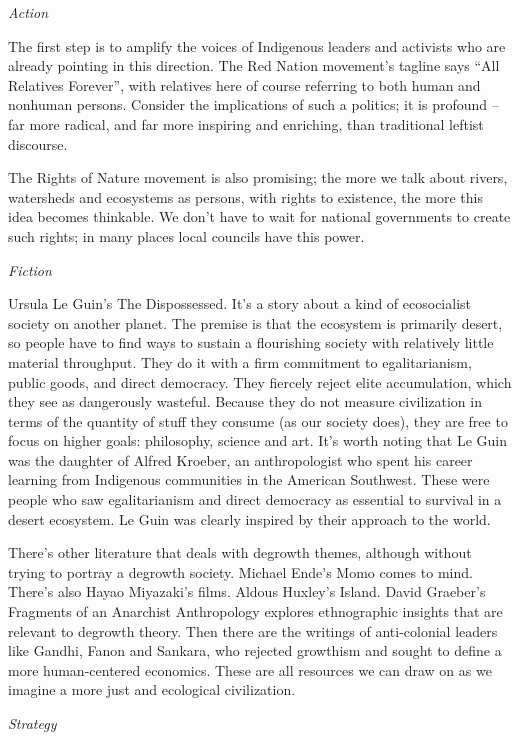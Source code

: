\documentclass[
]{book}
\begin{document}
\emph{Action}

The first step is to amplify the voices of Indigenous leaders and activists who are already pointing in this direction. The Red Nation movement's tagline says ``All Relatives Forever'', with relatives here of course referring to both human and nonhuman persons. Consider the implications of such a politics; it is profound -- far more radical, and far more inspiring and enriching, than traditional leftist discourse.

The Rights of Nature movement is also promising; the more we talk about rivers, watersheds and ecosystems as persons, with rights to existence, the more this idea becomes thinkable. We don't have to wait for national governments to create such rights; in many places local councils have this power.

\emph{Fiction}

Ursula Le Guin's The Dispossessed. It's a story about a kind of ecosocialist society on another planet. The premise is that the ecosystem is primarily desert, so people have to find ways to sustain a flourishing society with relatively little material throughput. They do it with a firm commitment to egalitarianism, public goods, and direct democracy. They fiercely reject elite accumulation, which they see as dangerously wasteful. Because they do not measure civilization in terms of the quantity of stuff they consume (as our society does), they are free to focus on higher goals: philosophy, science and art. It's worth noting that Le Guin was the daughter of Alfred Kroeber, an anthropologist who spent his career learning from Indigenous communities in the American Southwest. These were people who saw egalitarianism and direct democracy as essential to survival in a desert ecosystem. Le Guin was clearly inspired by their approach to the world.

There's other literature that deals with degrowth themes, although without trying to portray a degrowth society. Michael Ende's Momo comes to mind. There's also Hayao Miyazaki's films. Aldous Huxley's Island. David Graeber's Fragments of an Anarchist Anthropology explores ethnographic insights that are relevant to degrowth theory. Then there are the writings of anti-colonial leaders like Gandhi, Fanon and Sankara, who rejected growthism and sought to define a more human-centered economics. These are all resources we can draw on as we imagine a more just and ecological civilization.

\emph{Strategy}
\end{document}
